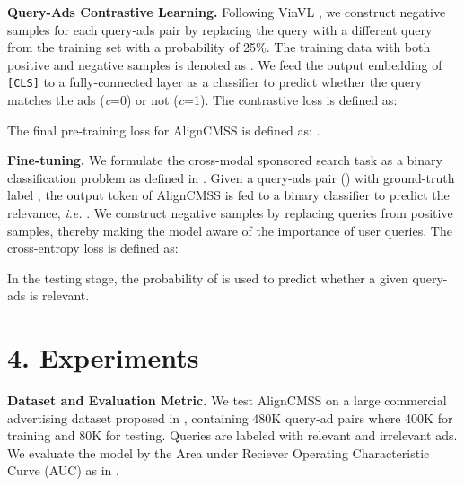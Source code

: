 \documentclass[letterpaper]{article} \usepackage{aaai24}  \usepackage{times}  \usepackage{helvet}  \usepackage{courier}  \usepackage[hyphens]{url}  \usepackage{graphicx} \urlstyle{rm} \def\UrlFont{\rm}  \usepackage{natbib}  \usepackage{caption} \frenchspacing  \setlength{\pdfpagewidth}{8.5in}  \setlength{\pdfpageheight}{11in}
\begin{document}
\noindent\textbf{Query-Ads Contrastive Learning.} Following VinVL \cite{zhang2021vinvl}, we construct negative samples for each query-ads pair by replacing the query with a different query from the training set with a probability of 25\%. The training data with both positive and negative samples is denoted as . We feed the output embedding of \texttt{[CLS]} to a fully-connected layer as a classifier  to predict whether the query matches the ads (\textit{c}=0) or not (\textit{c}=1). The contrastive loss is defined as:


The final pre-training loss for AlignCMSS is defined as: .

\noindent\textbf{Fine-tuning.}  We formulate the cross-modal sponsored search task as a binary classification problem as defined in \cite{DBLP:journals/corr/abs-2001-07966}. Given a query-ads pair () with ground-truth label , the output  token  of AlignCMSS is fed to a binary classifier to predict the relevance, \emph{i.e.} . We construct negative samples by replacing queries  from positive samples, thereby making the model aware of the importance of user queries. The cross-entropy loss is defined as:

In the testing stage, the probability of  is used to predict whether a given query-ads is relevant.

\section{4. Experiments}
\noindent\textbf{Dataset and Evaluation Metric.} We test AlignCMSS on a large commercial advertising dataset proposed in \cite{10.1145/3503161.3548226}, containing 480K query-ad pairs where 400K for training and 80K for testing. Queries are labeled with relevant and irrelevant ads. We evaluate the model by the Area under Reciever Operating Characteristic Curve (AUC) as in \cite{cortes2003auc}.
\end{document}
